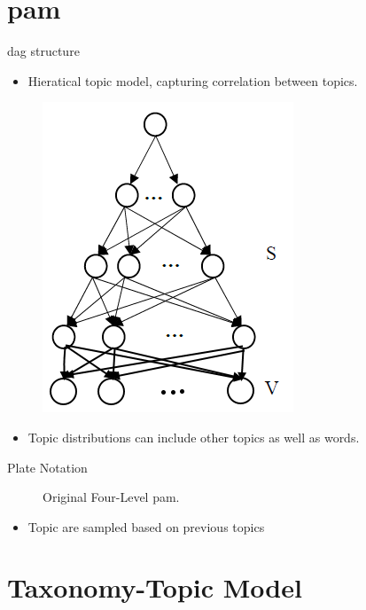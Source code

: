\section{\acrlong{pam}}

\begin{frame}{\insertsection}{\gls{dag} structure}
    \begin{itemize}
        \item Hieratical topic model, capturing correlation between topics.
    \end{itemize}
	
	\begin{figure}
		\centering
		\includegraphics[width=0.35 \textwidth]{../figures/pachinko_dag}
	\end{figure}
	
	\begin{itemize}
		\item Topic distributions can include other topics as well as words.
	\end{itemize}
\end{frame}

\begin{frame}{\insertsection}{Plate Notation}
	\begin{figure}
			\centering
			\resizebox{0.45\columnwidth}{!}{%
			
			}
			\caption{Original Four-Level \gls{pam}.}
	\end{figure}
	\begin{itemize}
		\item Topic are sampled based on previous topics
	\end{itemize}
\end{frame}

\section{Taxonomy-Topic Model}

